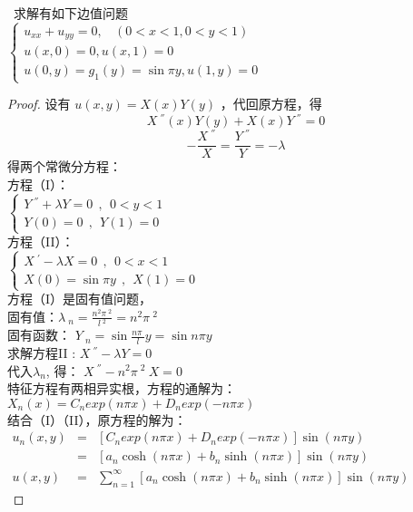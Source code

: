 \begin{example} %
 求解有如下边值问题 \\
$\displaystyle \begin{cases}
	u_{xx} +u_{yy} =0 ,~~~~ (0<x<1, 0<y<1)\\
	u(x,0)= 0,  u(x,1)= 0 \\
	u(0,y)= g_1 (y) =\sin \pi y,  u(1,y)= 0
\end{cases}$ \\
\end{example}
\begin{proof}
设有 	$\displaystyle  u(x,y)=X(x) Y(y)$ ，代回原方程，得
 \begin{equation*}
X~^{''}(x)Y(y) +X(x)Y~^{''}=0
\end{equation*}
 \begin{equation*}
-\frac{X~^{''}}{X}=\frac{Y~^{''} }{Y} =-\lambda 
\end{equation*}
得两个常微分方程：\\ 
方程（I）：\\
$\displaystyle  \begin{cases}
	Y~^{''} +\lambda Y=0  ~~,~~ 0<y<1\\
	Y(0)=0 ~~,~~Y(1)=0 
\end{cases}$ \\	
方程（II）：\\
$\displaystyle  \begin{cases}
	X~^{'} -\lambda X=0  ~~,~~ 0<x<1 \\
	X(0)=\sin \pi y~~,~~X(1)=0 
\end{cases}$ \\	

方程（I）是固有值问题，\\
固有值：$\displaystyle  \lambda~_n=\frac{n^2\pi~^2}{l~^2} =n^2\pi~^2$ \\ 
固有函数： $\displaystyle  Y~_n= \sin \frac{n\pi~}{l} y = \sin n \pi y $ \\

求解方程II : 	$\displaystyle  X~^{''} -\lambda {Y}=0 $ \\ 
代入$\lambda_n$, 得：
$\displaystyle  X~^{''} - n^2\pi~^2~X=0 $ \\
特征方程有两相异实根，方程的通解为： \\ 
{ $\displaystyle  X_n(x)=C_n exp(n\pi x )+ D_n exp(-n\pi x )$}\\ 

结合（I）（II），原方程的解为：\\ 
	$\begin{array}{llll}
		u_n(x,y) &=& [C_n exp(n\pi x )+ D_n exp(-n\pi x )] \sin (n \pi y)  \\ 
		&=& [a_n \cosh (n\pi x )+ b_n \sinh(n\pi x ) ]\sin (n \pi y)  \\ 
		u(x, y)    &=& \sum_{n=1}^{\infty }  [a_n \cosh (n\pi x )+ b_n \sinh (n\pi x ) ] \sin (n \pi y)  
	\end{array}$ \\
 

\end{proof}
